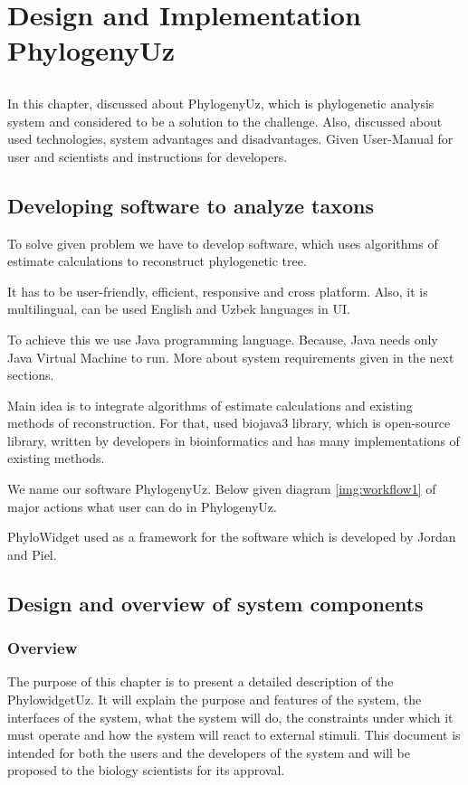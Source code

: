 \chapter{Design and Implementation PhylogenyUz}

\section*{}

In this chapter, discussed about PhylogenyUz, which 
is phylogenetic analysis system and considered to 
be a solution to the challenge. Also, discussed 
about used technologies, system advantages and 
disadvantages. Given User-Manual for user and scientists
and instructions for developers.

\section{Developing software to analyze taxons}

To solve given problem we have to develop software, 
which uses algorithms of estimate calculations to 
reconstruct phylogenetic tree.

It has to be user-friendly, efficient, 
responsive and cross platform. Also, it is multilingual, 
can be used English and Uzbek languages in UI.

To achieve this we use Java programming language. 
Because, Java needs only Java Virtual Machine to run.
More about system requirements given in the next sections.

Main idea is to integrate algorithms of estimate calculations
and existing methods of reconstruction.
For that, used biojava3 \cite{biojava} library, which is 
open-source library, written by developers in 
bioinformatics and has many implementations of 
existing methods.

We name our software PhylogenyUz.
Below given diagram \ref{img:workflow1} of major actions what 
user can do in PhylogenyUz.

PhyloWidget \cite{phylowidget} 
used as a framework for the software which is
developed by Jordan and Piel.

\section{Design and overview of system components}

\subsection{Overview}
The purpose of this chapter is to present a detailed 
description of the PhylowidgetUz. It will explain the 
purpose and features of the system, the interfaces of 
the system, what the system will do, the constraints 
under which it must operate and how the system 
will react to external stimuli. This document is intended 
for both the users and the developers of the system 
and will be proposed to the biology scientists for its approval.

